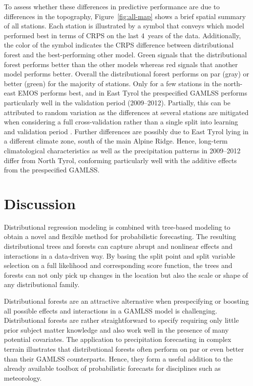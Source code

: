 \documentclass[aoas, preprint]{imsart}
\numberwithin{equation}{subsection}
\begin{document}
To assess whether these differences in predictive performance are due to differences
in the topography, Figure~\ref{fig:all-map} shows a brief spatial summary of all
stations. Each station is illustrated by a symbol that conveys which
model performed best in terms of CRPS on the last 4~years of the data.
Additionally, the color of the symbol indicates the CRPS difference between 
distributional forest and the best-performing other model. Green signals that
the distributional forest performs better than the other models whereas red
signals that another model performs better. Overall the distributional forest
performs on par (gray) or better (green) for the majority of stations. Only
for a few stations in the north-east EMOS performs best, and in East Tyrol
the prespecified GAMLSS performs particularly well in the validation period
(2009--2012). Partially, this can be attributed to random variation as
the differences at several stations are mitigated when considering a full
cross-validation rather than a single split into learning and validation period
\citep[see Supplement~A,][and the corresponding discussion in the next section]{Schlosser+Hothorn+Stauffer:2019a}.
Further differences are possibly due to East Tyrol lying in a different
climate zone, south of the main Alpine Ridge. Hence, long-term climatological
characteristics as well as the precipitation patterns in 2009--2012 differ
from North Tyrol, conforming particularly well with the additive effects from
the prespecified GAMLSS.


\section{Discussion}
\label{sec:discussion}

Distributional regression modeling is combined with tree-based modeling
to obtain a novel and flexible method for probabilistic forecasting.
The resulting distributional trees and forests can capture abrupt and
nonlinear effects and interactions in a data-driven way. By basing the
split point and split variable selection on a full likelihood and
corresponding score function, the trees and forests can not only pick
up changes in the location but also the scale or shape of any distributional
family.

Distributional forests are an attractive alternative when prespecifying or
boosting all possible effects and interactions in a GAMLSS model is
challenging.  Distributional forests are rather straightforward to specify
requiring only little prior subject matter knowledge and also work well in the
presence of many potential covariates. The application to precipitation
forecasting in complex terrain illustrates that distributional forests often
perform on par or even better than their GAMLSS counterparts. Hence, they form
a useful addition to the already available toolbox of probabilistic forecasts
for disciplines such as meteorology.
\end{document}
